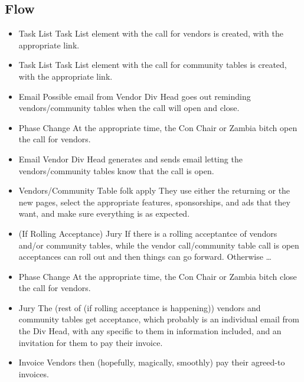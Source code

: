 \documentclass[captions=tablesignature]{scrartcl}
\begin{document}
\subsection{Flow}
\label{sec-3-2}
\begin{itemize}
\item Task List
\label{sec-3-2-1}
Task List element with the call for vendors is created, with the
appropriate link.

\item Task List
\label{sec-3-2-2}
Task List element with the call for community tables is created,
with the appropriate link.

\item Email
\label{sec-3-2-3}
Possible email from Vendor Div Head goes out reminding
vendors/community tables when the call will open and close.

\item Phase Change
\label{sec-3-2-4}
At the appropriate time, the Con Chair or Zambia bitch open the
call for vendors.

\item Email
\label{sec-3-2-5}
Vendor Div Head generates and sends email letting the
vendors/community tables know that the call is open.

\item Vendors/Community Table folk apply
\label{sec-3-2-6}
They use either the returning or the new pages, select the
appropriate features, sponsorships, and ads that they want, and
make sure everything is as expected.

\item (If Rolling Acceptance) Jury
\label{sec-3-2-7}
If there is a rolling acceptantce of vendors and/or community
tables, while the vendor call/community table call is open
acceptances can roll out and then things can go forward.
Otherwise \ldots{}

\item Phase Change
\label{sec-3-2-8}
At the appropriate time, the Con Chair or Zambia bitch close the
call for vendors.

\item Jury
\label{sec-3-2-9}
The (rest of (if rolling acceptance is happening)) vendors and
community tables get acceptance, which probably is an individual
email from the Div Head, with any specific to them in information
included, and an invitation for them to pay their invoice.

\item Invoice
\label{sec-3-2-10}
Vendors then (hopefully, magically, smoothly) pay their agreed-to
invoices.


\end{itemize}
\end{document}
